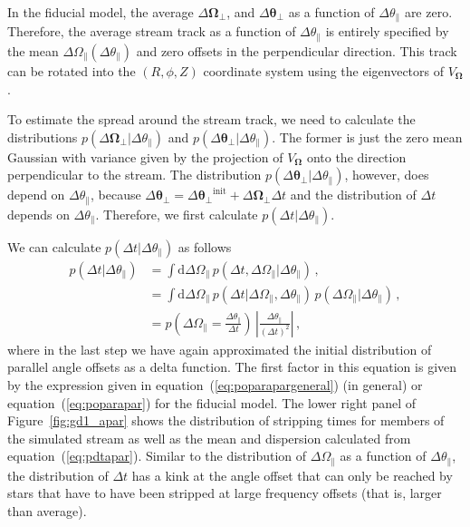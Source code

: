 \documentclass[12pt,preprint]{aastex}
\newcommand{\dd}{\mathrm{d}}
\newcommand{\eqnname}{equation}
\newcommand{\equationname}{\eqnname}
\renewcommand{\figurename}{Figure}
\renewcommand{\vec}[1]{\ensuremath{\mathbf{#1}}}
\newcommand{\veco}{\ensuremath{\vec{\Omega}}}
\newcommand{\veca}{\ensuremath{\boldsymbol\theta}}
\newcommand{\apar}{\ensuremath{\theta_\parallel}}
\newcommand{\opar}{\ensuremath{\Omega_\parallel}}
\newcommand{\aperp}{\ensuremath{\veca_\perp}}
\newcommand{\operp}{\ensuremath{\veco_\perp}}
\begin{document}
In the fiducial model, the average $\Delta \operp$, and $\Delta
\aperp$ as a function of $\Delta \apar$ are zero. Therefore, the
average stream track as a function of $\Delta \apar$ is entirely
specified by the mean $\Delta \opar(\Delta \apar)$ and zero offsets in
the perpendicular direction. This track can be rotated into the
$(R,\phi,Z)$ coordinate system using the eigenvectors of $V_\veco$.

To estimate the spread around the stream track, we need to calculate
the distributions $p(\Delta \operp|\Delta \apar)$ and $p(\Delta
\aperp|\Delta \apar)$. The former is just the zero mean Gaussian with
variance given by the projection of $V_\veco$ onto the direction
perpendicular to the stream. The distribution $p(\Delta \aperp|\Delta
\apar)$, however, does depend on $\Delta \apar$, because $\Delta
\aperp = \Delta \aperp^{\mathrm{init}} + \Delta \operp \Delta t$ and
the distribution of $\Delta t$ depends on $\Delta \apar$. Therefore,
we first calculate $p(\Delta t | \Delta \apar)$.

We can calculate $p(\Delta t | \Delta \apar)$ as follows
\begin{equation}\label{eq:pdtapar}
\begin{split}
  p(\Delta t | \Delta \apar) & = \int \dd \Delta \opar\,p(\Delta t,\Delta \opar|\Delta \apar)\,,\\
  & = \int \dd \Delta \opar\,p(\Delta t|\Delta \opar,\Delta \apar)\,p(\Delta \opar|\Delta \apar)\,,\\
  & = p\left(\Delta \opar = \frac{\Delta \apar}{\Delta t}\right)\,\left|\frac{\Delta \apar}{(\Delta t)^2}\right|\,,
\end{split}
\end{equation}
where in the last step we have again approximated the initial
distribution of parallel angle offsets as a delta function. The first
factor in this equation is given by the expression given in
\equationname~(\ref{eq:poparapargeneral}) (in general) or
\equationname~(\ref{eq:poparapar}) for the fiducial model. The lower
right panel of \figurename~\ref{fig:gd1_apar} shows the distribution
of stripping times for members of the simulated stream as well as the
mean and dispersion calculated from
\equationname~(\ref{eq:pdtapar}). Similar to the distribution of
$\Delta \opar$ as a function of $\Delta \apar$, the distribution of
$\Delta t$ has a kink at the angle offset that can only be reached by
stars that have to have been stripped at large frequency offsets (that
is, larger than average). 
\end{document}

